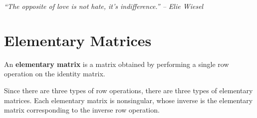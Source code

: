 \begin{center} 
\emph{``The opposite of love is not hate, it's indifference.'' -- Elie Wiesel}
\end{center}

\section{Elementary Matrices}\label{sec:elementary}
\begin{Def} An \textbf{elementary matrix} is a matrix obtained by performing a single row operation on the identity matrix.
\end{Def}\vs

Since there are three types of row operations, there are three types of elementary matrices. Each elementary matrix is nonsingular, whose inverse is the elementary matrix corresponding to the inverse row operation.\\
